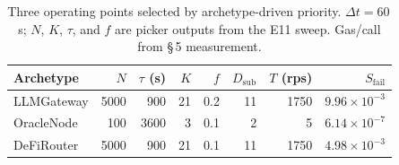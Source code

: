 \begin{table}[t]
\centering
\caption{Three operating points selected by archetype-driven priority. $\Delta t=60$\,s; $N$, $K$, $\tau$, and $f$ are picker outputs from the E11 sweep. Gas/call from \S\,5 measurement.}
\label{tab:archetypes}
\begin{tabular}{lrrrrrrr}
\hline
Archetype & $N$ & $\tau$ (s) & $K$ & $f$ & $D_{\mathrm{sub}}$ & $T$ (rps) & $S_{\mathrm{fail}}$ \\
\hline
LLMGateway & 5000 & 900 & 21 & 0.2 & 11 & 1750 & $9.96\times 10^{-3}$ \\
OracleNode & 100 & 3600 & 3 & 0.1 & 2 & 5 & $6.14\times 10^{-7}$ \\
DeFiRouter & 5000 & 900 & 21 & 0.1 & 11 & 1750 & $4.98\times 10^{-3}$ \\
\hline
\end{tabular}
\end{table}
